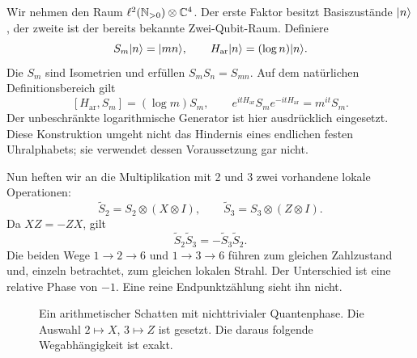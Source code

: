 Wir nehmen den Raum $\ell^2(\mathbb N_{>0})\otimes\mathbb C^4$. Der erste Faktor besitzt Basiszustände $\lvert n\rangle$, der zweite ist der bereits bekannte Zwei-Qubit-Raum. Definiere
\[
 S_m\lvert n\rangle=\lvert mn\rangle,\qquad H_{\mathrm{ar}}\lvert n\rangle=(\log n)\lvert n\rangle.
\]
Die $S_m$ sind Isometrien und erfüllen $S_mS_n=S_{mn}$. Auf dem natürlichen Definitionsbereich gilt
\[
 [H_{\mathrm{ar}},S_m]=(\log m)S_m,
 \qquad e^{itH_{\mathrm{ar}}}S_me^{-itH_{\mathrm{ar}}}=m^{it}S_m.
\]
Der unbeschränkte logarithmische Generator ist hier ausdrücklich eingesetzt. Diese Konstruktion umgeht nicht das Hindernis eines endlichen festen Uhralphabets; sie verwendet dessen Voraussetzung gar nicht.

Nun heften wir an die Multiplikation mit 2 und 3 zwei vorhandene lokale Operationen:
\begin{equation}
 \widetilde S_2=S_2\otimes(X\otimes I),\qquad
 \widetilde S_3=S_3\otimes(Z\otimes I).
\end{equation}
Da $XZ=-ZX$, gilt
\begin{equation}
 \widetilde S_2\widetilde S_3=-\widetilde S_3\widetilde S_2.
 \label{eq:arithmetic-projective}
\end{equation}
Die beiden Wege $1\to2\to6$ und $1\to3\to6$ führen zum gleichen Zahlzustand und, einzeln betrachtet, zum gleichen lokalen Strahl. Der Unterschied ist eine relative Phase von $-1$. Eine reine Endpunktzählung sieht ihn nicht.

\begin{figure}[H]\centering
{}
\caption{Ein arithmetischer Schatten mit nichttrivialer Quantenphase. Die Auswahl $2\mapsto X$, $3\mapsto Z$ ist gesetzt. Die daraus folgende Wegabhängigkeit ist exakt.}
\end{figure}

